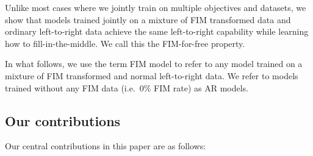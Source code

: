 \documentclass[postscript]{article}
\begin{document}
Unlike most cases where we jointly train on multiple objectives and datasets, we show that models trained jointly on a mixture of FIM transformed data and ordinary left-to-right data achieve the same left-to-right capability while learning how to fill-in-the-middle. We call this the FIM-for-free property.

In what follows, we use the term FIM model to refer to any model trained on a mixture of FIM transformed and normal left-to-right data. We refer to models trained without any FIM data (i.e.~0\% FIM rate) as AR models. 

 \subsection{Our contributions}\label{sec:intro:contrib}
  Our central contributions in this paper are as follows:
\end{document}

